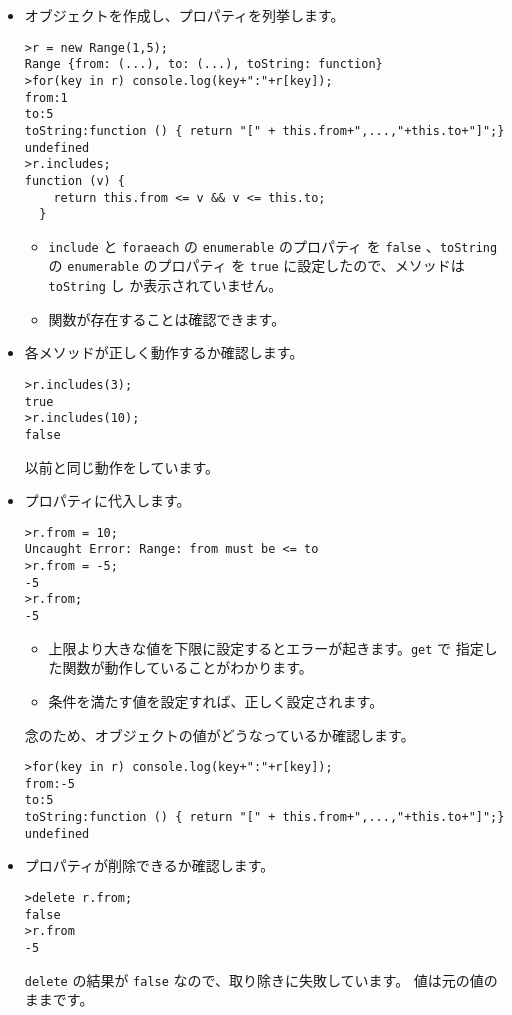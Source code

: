 \begin{itemize}
 \item オブジェクトを作成し、プロパティを列挙します。
\begin{Verbatim}
>r = new Range(1,5);
Range {from: (...), to: (...), toString: function}
>for(key in r) console.log(key+":"+r[key]);
from:1
to:5
toString:function () { return "[" + this.from+",...,"+this.to+"]";}
undefined
>r.includes;
function (v) {
    return this.from <= v && v <= this.to;
  } 
\end{Verbatim}
\begin{itemize}
 \item \texttt{include} と \texttt{foraeach} の \texttt{enumerable} のプロパティ
       を \texttt{false} 、\texttt{toString} の \texttt{enumerable} のプロパティ
       を \texttt{true} に設定したので、メソッドは \texttt{toString} し
       か表示されていません。
 \item 関数が存在することは確認できます。
\end{itemize}
 \item 各メソッドが正しく動作するか確認します。
\begin{Verbatim}
>r.includes(3);
true
>r.includes(10);
false
\end{Verbatim}
以前と同じ動作をしています。
 \item プロパティに代入します。
\begin{Verbatim}
>r.from = 10;
Uncaught Error: Range: from must be <= to 
>r.from = -5;
-5
>r.from;
-5
\end{Verbatim}
\begin{itemize}
 \item 上限より大きな値を下限に設定するとエラーが起きます。\texttt{get} で
       指定した関数が動作していることがわかります。
 \item 条件を満たす値を設定すれば、正しく設定されます。
\end{itemize}
念のため、オブジェクトの値がどうなっているか確認します。
\begin{Verbatim}
>for(key in r) console.log(key+":"+r[key]);
from:-5
to:5
toString:function () { return "[" + this.from+",...,"+this.to+"]";}
undefined
\end{Verbatim}
 \item プロパティが削除できるか確認します。
\begin{Verbatim}
>delete r.from;
false
>r.from
-5
\end{Verbatim}
\texttt{delete} の結果が \texttt{false} なので、取り除きに失敗しています。
       値は元の値のままです。
\end{itemize}

